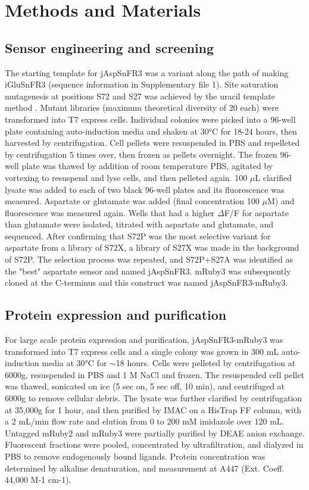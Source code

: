 \section{Methods and Materials}

\subsection{Sensor engineering and screening}
The starting template for jAspSnFR3 was a variant along the path of making iGluSnFR3 (sequence information in Supplementary file 1).
Site saturation mutagenesis at positions S72 and S27 was achieved by the uracil template method \cite{Kunkel1985-ev}.
Mutant libraries (maximum theoretical diversity of 20 each) were transformed into T7 express cells.
Individual colonies were picked into a 96-well plate containing auto-induction media \cite{Studier2005-ki} and shaken at 30°C for 18-24 hours, then harvested by centrifugation.
Cell pellets were resuspended in PBS and repelleted by centrifugation 5 times over, then frozen as pellets overnight.
The frozen 96-well plate was thawed by addition of room temperature PBS, agitated by vortexing to resuspend and lyse cells, and then pelleted again.
100 $\mu$L clarified lysate was added to each of two black 96-well plates and its fluorescence was measured.
Aspartate or glutamate was added (final concentration 100 $\mu$M) and fluorescence was measured again.
Wells that had a higher $\Delta$F/F for aspartate than glutamate were isolated, titrated with aspartate and glutamate, and sequenced.
After confirming that S72P was the most selective variant for aspartate from a library of S72X, a library of S27X was made in the background of S72P.
The selection process was repeated, and S72P+S27A was identified as the "best" aspartate sensor and named jAspSnFR3.
mRuby3 was subsequently cloned at the C-terminus and this construct was named jAspSnFR3-mRuby3.

\subsection{Protein expression and purification}
For large scale protein expression and purification, jAspSnFR3-mRuby3 was transformed into T7 express cells and a single colony was grown in 300 mL auto-induction media \cite{Studier2005-ki} at 30°C for $\sim$18 hours.
Cells were pelleted by centrifugation at 6000g, resuspended in PBS and 1 M NaCl and frozen.
The resuspended cell pellet was thawed, sonicated on ice (5 sec on, 5 sec off, 10 min), and centrifuged at 6000g to remove cellular debris.
The lysate was further clarified by centrifugation at 35,000g for 1 hour, and then purified by IMAC on a HisTrap FF column, with a 2 mL/min flow rate and elution from 0 to 200 mM imidazole over 120 mL.
Untagged mRuby2 and mRuby3 were partially purified by DEAE anion exchange.
Fluorescent fractions were pooled, concentrated by ultrafiltration, and dialyzed in PBS to remove endogenously bound ligands.
Protein concentration was determined by alkaline denaturation, and measurement at A447 (Ext. Coeff. 44,000 M-1 cm-1).

